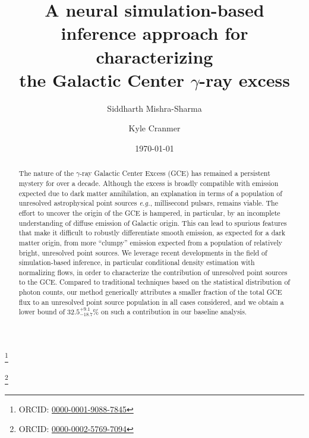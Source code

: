 \documentclass[prd,aps,10pt,nofootinbib,twocolumn,superscriptaddress,preprintnumbers,balancelastpage,longbibliography]{revtex4-1}
\begin{document}
\title{A neural simulation-based inference approach for characterizing \\ the Galactic Center $\gamma$-ray excess}

\author{Siddharth Mishra-Sharma}
\thanks{ORCID: \href{https://orcid.org/0000-0001-9088-7845}{0000-0001-9088-7845}}

\author{Kyle Cranmer}
\thanks{ORCID: \href{https://orcid.org/0000-0002-5769-7094}{0000-0002-5769-7094}}

\date{\today}

\begin{abstract}
The nature of the \Fermi $\gamma$-ray Galactic Center Excess (GCE) has remained a persistent mystery for over a decade. Although the excess is broadly compatible with emission expected due to dark matter annihilation, an explanation in terms of a population of unresolved astrophysical point sources \emph{e.g.}, millisecond pulsars, remains viable. The effort to uncover the origin of the GCE is hampered, in particular, by an incomplete understanding of diffuse emission of Galactic origin. This can lead to spurious features that make it difficult to robustly differentiate smooth emission, as expected for a dark matter origin, from more ``clumpy'' emission expected from a population of relatively bright, unresolved point sources. We leverage recent developments in the field of simulation-based inference, in particular conditional density estimation with normalizing flows, in order to characterize the contribution of unresolved point sources to the GCE. Compared to traditional techniques based on the statistical distribution of photon counts, our method generically attributes a smaller fraction of the total GCE flux to an unresolved point source population in all cases considered, and we obtain a lower bound of $32.5^{+9.1}_{-18.7}\%$ on such a contribution in our baseline analysis.
\end{abstract}
\end{document}

